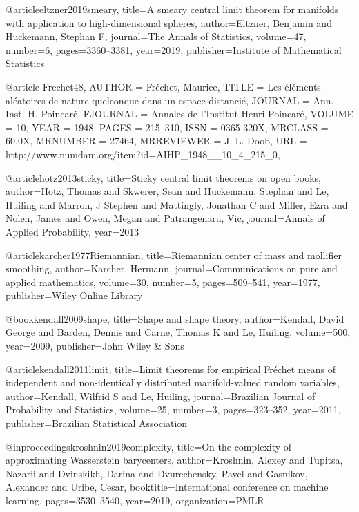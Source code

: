 @article{eltzner2019smeary,
  title={{A smeary central limit theorem for manifolds with application to high-dimensional spheres}},
  author={Eltzner, Benjamin and Huckemann, Stephan F},
  journal={The Annals of Statistics},
  volume={47},
  number={6},
  pages={3360--3381},
  year={2019},
  publisher={Institute of Mathematical Statistics}
}



@article {Frechet48,
    AUTHOR = {Fr\'{e}chet, Maurice},
     TITLE = {Les \'{e}l\'{e}ments al\'{e}atoires de nature quelconque dans un espace
              distanci\'{e}},
   JOURNAL = {Ann. Inst. H. Poincar\'{e}},
  FJOURNAL = {Annales de l'Institut Henri Poincar\'{e}},
    VOLUME = {10},
      YEAR = {1948},
     PAGES = {215--310},
      ISSN = {0365-320X},
   MRCLASS = {60.0X},
  MRNUMBER = {27464},
MRREVIEWER = {J. L. Doob},
       URL = {http://www.numdam.org/item?id=AIHP_1948__10_4_215_0},
}


@article{hotz2013sticky,
  title={Sticky central limit theorems on open books},
  author={Hotz, Thomas and Skwerer, Sean and Huckemann, Stephan and Le, Huiling and Marron, J Stephen and Mattingly, Jonathan C and Miller, Ezra and Nolen, James and Owen, Megan and Patrangenaru, Vic},
  journal={Annals of Applied Probability},
  year={2013}
}

@article{karcher1977Riemannian,
  title={{R}iemannian center of mass and mollifier smoothing},
  author={Karcher, Hermann},
  journal={Communications on pure and applied mathematics},
  volume={30},
  number={5},
  pages={509--541},
  year={1977},
  publisher={Wiley Online Library}
}


@book{kendall2009shape,
  title={Shape and shape theory},
  author={Kendall, David George and Barden, Dennis and Carne, Thomas K and Le, Huiling},
  volume={500},
  year={2009},
  publisher={John Wiley \& Sons}
}


@article{kendall2011limit,
  title={Limit theorems for empirical {F}r{\'e}chet means of independent and non-identically distributed manifold-valued random variables},
  author={Kendall, Wilfrid S and Le, Huiling},
  journal={Brazilian Journal of Probability and Statistics},
  volume={25},
  number={3},
  pages={323--352},
  year={2011},
  publisher={Brazilian Statistical Association}
}

@inproceedings{kroshnin2019complexity,
  title={On the complexity of approximating Wasserstein barycenters},
  author={Kroshnin, Alexey and Tupitsa, Nazarii and Dvinskikh, Darina and Dvurechensky, Pavel and Gasnikov, Alexander and Uribe, Cesar},
  booktitle={International conference on machine learning},
  pages={3530--3540},
  year={2019},
  organization={PMLR}
}


